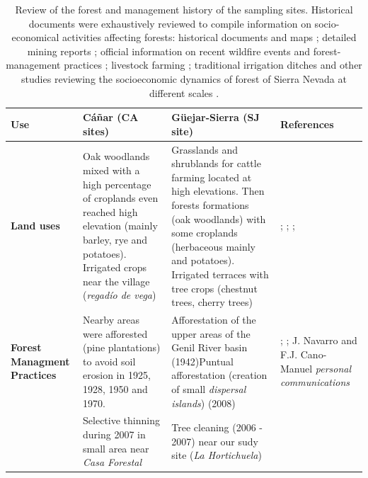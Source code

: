 \begin{table} 
\caption{Review of the forest and management history of the sampling sites. Historical documents were exhaustively reviewed to compile information on socio-economical activities affecting forests: historical documents and maps \autocite[\emph{e.g.}][]{Titos1990}; detailed mining reports \autocite[\emph{e.g.}][]{Maestre1858}; official information on recent wildfire events and forest-management practices \autocite[\emph{e.g.}][]{Bonetetal2016HistorySierra}; livestock farming \autocite[\emph{e.g.}][]{MorenoLlorcaetal2016HistoricalAnalysis}; traditional irrigation ditches \autocite[\emph{e.g.}][]{RuizRuiz2017} and other studies reviewing the socioeconomic dynamics of forest of Sierra Nevada at different scales \autocite[\emph{e.g.}][]{JimenezOlivenciaetal2015MedioSiglo}.}
\label{tab:dendro:reviewusos}
\centering
\begingroup\tiny\selectfont
\begin{tabular}{
>{\centering\arraybackslash}p{}>{\raggedright\arraybackslash}p{}>{\raggedright\arraybackslash}p{}>{\raggedright\arraybackslash}p{}}
\toprule
\textbf{Use} & \textbf{Cáñar (CA sites)} & \textbf{Güejar-Sierra (SJ site)} & \textbf{References} \\
\midrule
\textbf{Land uses} & Oak woodlands mixed with a high percentage of croplands even reached high elevation (mainly barley, rye and potatoes). Irrigated crops near the village (\textit{regadío de vega}) & Grasslands and shrublands for cattle farming located at high elevations. Then forests formations (oak woodlands) with some croplands (herbaceous mainly and potatoes). Irrigated terraces with tree crops (chestnut trees, cherry trees) & \textcite{Calatrava2019}; \textcite{JimenezOlivenciaetal2015MedioSiglo}; \textcite{MorenoLlorcaetal2016HistoricalAnalysis}; \textcite{2015Zoido}\\ \midrule
\textbf{Forest Managment Practices} & Nearby areas were afforested (pine plantations) to avoid soil erosion in 1925, 1928, 1950 and 1970. & Afforestation of the upper areas of the Genil River basin (1942)Puntual afforestation (creation of small \textit{dispersal islands}) (2008) & \textcite{Bonetetal2016HistorySierra}; \textcite{MorenoLlorcaetal2016HistoricalAnalysis}; J. Navarro and F.J. Cano-Manuel \textit{personal communications} \\
 & Selective thinning during 2007 in small area near \textit{Casa Forestal} & Tree cleaning (2006 - 2007) near our sudy site (\textit{La Hortichuela}) &  \\

\end{tabular}
\end{table}
